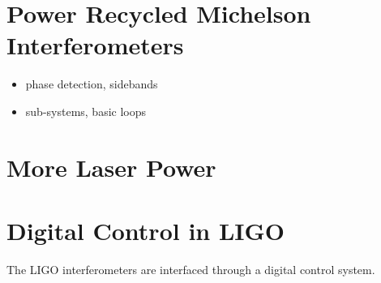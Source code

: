 \section{Power Recycled Michelson Interferometers}
\begin{itemize}
\item phase detection, sidebands
\item sub-systems, basic loops
\end{itemize}




\section{More Laser Power}




\section{Digital Control in LIGO}
The LIGO interferometers are interfaced through a digital control
system. 


